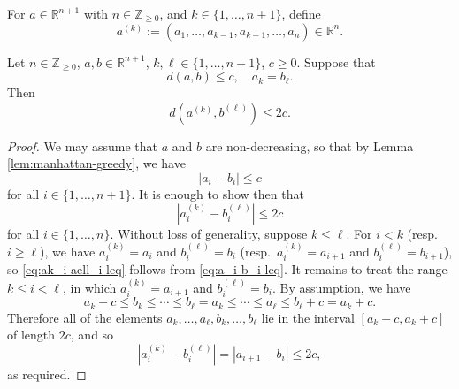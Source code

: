 \begin{definition}
  For $a \in \mathbb{R}^{n+1}$ with $n \in \mathbb{Z}_{\geq 0}$, and $k \in \{1,\dotsc, n+1\}$, define
  \begin{equation*}
    a^{(k)} := (a_1,\dotsc,a_{k-1},a_{k+1},\dotsc,a_{n}) \in \mathbb{R}^{n}.
  \end{equation*}
\end{definition}
\begin{lemma}\label{lem:scratch-research:let-n-geq}
  Let $n \in \mathbb{Z}_{\geq 0}$, $a,b \in \mathbb{R}^{n+1}$, $k,\ell \in \{1,\dotsc,n+1\}$, $c \geq 0$.  Suppose that
  \begin{equation*}
    d (a,b) \leq c, \quad
    a_k = b_{\ell}.
  \end{equation*}
  Then
  \begin{equation*}
    d (a^{(k)}, b^{(\ell)}) \leq 2 c.
  \end{equation*}
\end{lemma}
\begin{proof}
  We may assume that $a$ and $b$ are non-decreasing, so that by Lemma \ref{lem:manhattan-greedy}, we have
  \begin{equation}\label{eq:a_i-b_i-leq}
    |a_i - b_i| \leq c
  \end{equation}
  for all $i \in \{1,\dotsc,n+1\}$.  It is enough to show then that
  \begin{equation}\label{eq:ak_i-aell_i-leq}
    |a^{(k)}_i - b^{(\ell)}_i| \leq 2 c
  \end{equation}
  for all $i \in \{1,\dotsc,n\}$.  Without loss of generality, suppose $k \leq \ell$.  For $i < k$ (resp.\ $i \geq \ell$), we have $a^{(k)}_i = a_i$ and $b^{(\ell)}_i = b_i$ (resp.\ $a^{(k)}_i = a_{i+1}$ and $b^{(\ell)}_i = b_{i+1}$), so \eqref{eq:ak_i-aell_i-leq} follows from \eqref{eq:a_i-b_i-leq}.  It remains to treat the range $k \leq i < \ell$, in which $a_i^{(k)} = a_{i+1}$ and $b_i^{(\ell)} = b_i$.  By assumption, we have
  \begin{equation*}
    a_k - c \leq b_k \leq \dotsb \leq b_{\ell} = a_k \leq \dotsb \leq a_{\ell} \leq b_{\ell} + c = a_k + c.
  \end{equation*}
  Therefore all of the elements $a_k,\dotsc,a_{\ell}, b_k,\dotsc,b_{\ell}$ lie in the interval $[a_k-c, a_k+c]$ of length $2 c$, and so
  \begin{equation*}
    |a_i^{(k)} - b_i^{(\ell)}| = |a_{i+1} - b_i| \leq 2 c,
  \end{equation*}
  as required.
\end{proof}




